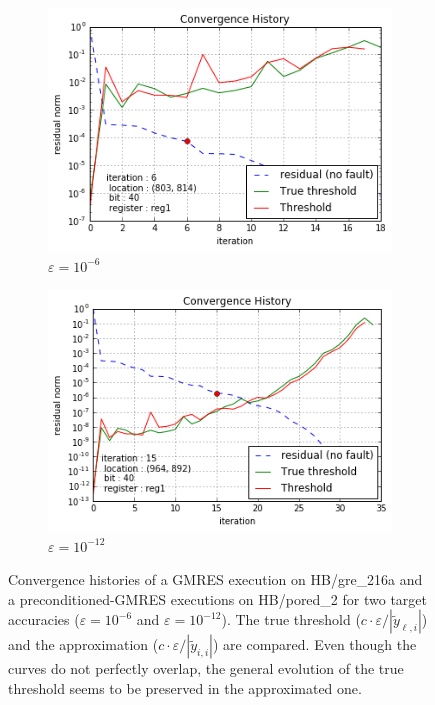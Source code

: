 \begin{figure}[h]
\begin{minipage}[b]{0.48\linewidth}
	\begin{subfigure}[t]{\linewidth}
		\centering
		\includegraphics[width=1.1\linewidth]{figures/pores_2/convergence_history_threshold_evaluation_0.png}
		\caption{$\varepsilon = 10^{-6}$}\label{fig:pores_2_conv_hist_threshold_evaluation_0}	
	\end{subfigure}
    \quad
    \begin{subfigure}[t]{\linewidth}
		\centering
		\includegraphics[width=1.1\linewidth]{figures/pores_2/convergence_history_threshold_evaluation_1.png}
		\caption{$\varepsilon = 10^{-12}$}\label{fig:pores_2_conv_hist_threshold_evaluation_1}	
	\end{subfigure}

	\end{minipage}
\caption{Convergence histories of a GMRES execution on HB/gre_216a and a preconditioned-GMRES executions on HB/pored_2 for two target accuracies ($\varepsilon = 10^{-6}$ and $\varepsilon = 10^{-12}$). The true threshold ($c \cdot \varepsilon / |\widetilde{y}_{\ell, i}|$) and the approximation ($c \cdot \varepsilon / |\widetilde{y}_{i, i}|$) are compared. Even though the curves do not perfectly overlap, the general evolution of the true threshold seems to be preserved in the approximated one.}\label{fig:conv_hist_threshold_evaluation}
\end{figure}





